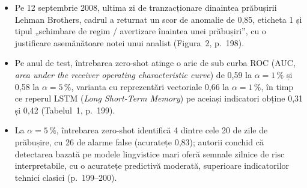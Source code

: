 \textbf{}
\begin{itemize}
\item {}%
{Pe 12 septembrie 2008, ultima zi de tranzacționare dinaintea prăbușirii Lehman Brothers, cadrul a returnat un scor de anomalie de 0,85, eticheta 1 și tipul „schimbare de regim / avertizare înaintea unei prăbușiri”, cu o justificare asemănătoare notei unui analist (Figura~2, p.~198).}
\item {}%
{Pe anul de test, întrebarea zero-shot atinge o arie de sub curba ROC (AUC, \emph{area under the receiver operating characteristic curve}) de 0,59 la $\alpha=1\,\%$ și 0,58 la $\alpha=5\,\%$, varianta cu reprezentări vectoriale 0,66 la $\alpha=1\,\%$, în timp ce reperul LSTM (\emph{Long Short-Term Memory}) pe aceiași indicatori obține 0,31 și 0,42 (Tabelul~1, p.~199).}
\item {}%
{La $\alpha=5\,\%$, întrebarea zero-shot identifică 4 dintre cele 20 de zile de prăbușire, cu 26 de alarme false (acuratețe 0,83); autorii conchid că detectarea bazată pe modele lingvistice mari oferă semnale zilnice de risc interpretabile, cu o acuratețe predictivă moderată, superioare indicatorilor tehnici clasici (p.~199--200).}
\end{itemize}

